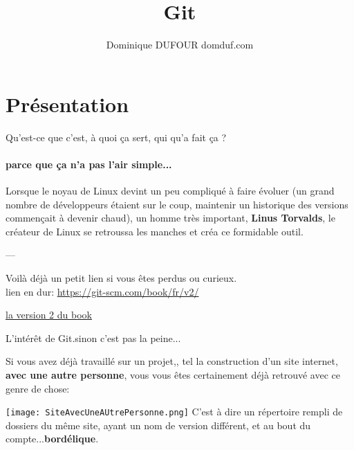 \documentclass[10pt]{beamer}
\author{Dominique DUFOUR domduf.com}
\title{Git}
\begin{document}
\begin{frame}
\titlepage
\end{frame}

\begin{frame}
\tableofcontents
\end{frame}
\section{Présentation}

\begin{frame}{Qu'est-ce que c'est, à quoi ça sert, qui qu'a fait ça ?}
\framesubtitle{parce que ça n'a pas l'air simple...}

Lorsque le noyau de Linux devint un peu compliqué à faire évoluer (un grand nombre de développeurs étaient sur le coup, maintenir un historique des versions commençait à devenir chaud), un homme très important, \textbf{Linus Torvalds}, le créateur de Linux se retroussa les manches et créa ce formidable outil.

---

Voilà déjà un petit lien si vous êtes perdus ou curieux.
\\
lien en dur: \url{https://git-scm.com/book/fr/v2/}

\href{https://git-scm.com/book/fr/v2/}{la version 2 du book}

\end{frame}



\begin{frame}{L'intérêt de Git.}{sinon c'est pas la peine...}

Si vous avez déjà travaillé sur un projet,, tel la construction d'un site internet, \textbf{avec une autre personne}, vous vous êtes 
certainement déjà retrouvé avec ce genre de chose:

\texttt{[image: SiteAvecUneAUtrePersonne.png]}
C'est à dire un répertoire rempli de dossiers du même site, ayant un nom de version différent, et au bout du compte...\textbf{bordélique}.

\end{frame}
\end{document}
